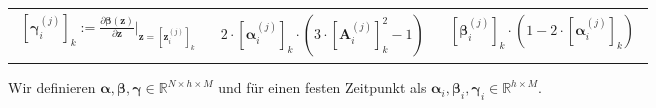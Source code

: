 \documentclass[a4paper, 12pt]{scrartcl}
\begin{document}
\begin{center}
\begin{tabular}{c | c | c}
        \hline
        $\begin{aligned}
            \left[\bm{\gamma}^{(j)}_i\right]_k :=\frac{\partial \bm{\beta}(\bm{z})}{\partial \bm{z}} \bigg|_{\bm{z} = \left[\bm{z}_i^{(j)}\right]_k}
        \end{aligned}$
        &
        $\begin{aligned}
            2 \cdot  \left[\bm{\alpha}^{(j)}_i\right]_k \cdot \left( 3 \cdot \left[\bm{A}^{(j)}_i\right]_k^2 -1 \right)
        \end{aligned}$
        &
        $\begin{aligned}
            \left[\bm{\beta}^{(j)}_i\right]_k \cdot \left(1 - 2 \cdot  \left[\bm{\alpha}^{(j)}_i\right]_k \right) 
        \end{aligned}$ 
    \end{tabular}
\end{center}

Wir definieren $\bm{\alpha},\bm{\beta}, \bm{\gamma} \in \mathbb{R}^{N \times h \times M}$ und für einen festen Zeitpunkt
als $\bm{\alpha}_i,\bm{\beta}_i, \bm{\gamma}_i \in \mathbb{R}^{h \times M}$. 
\end{document}
